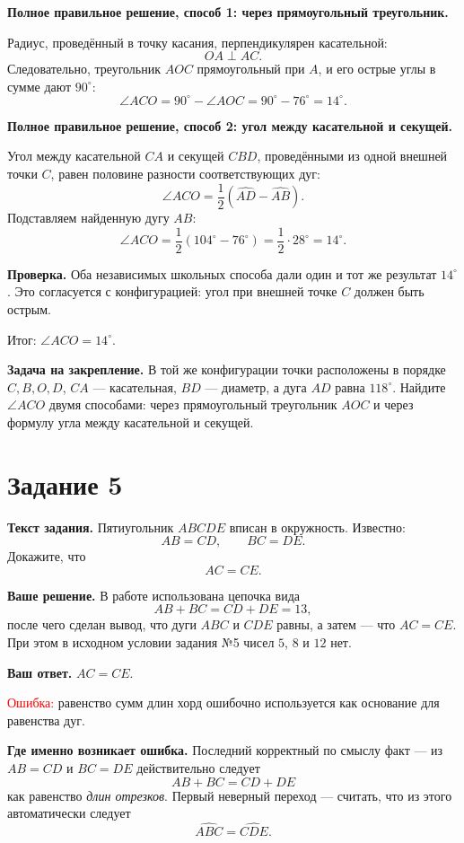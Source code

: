 \documentclass[12pt,a4paper]{article}
\newcommand{\errlabel}[1]{\textcolor{red}{Ошибка:} #1}
\newcommand{\resultlabel}[1]{\textcolor{teal!60!black}{Итог:} #1}
\begin{document}
\textbf{Полное правильное решение, способ 1: через прямоугольный треугольник.}

Радиус, проведённый в точку касания, перпендикулярен касательной:
\[
OA\perp AC.
\]
Следовательно, треугольник $AOC$ прямоугольный при $A$, и его острые углы в сумме дают $90^\circ$:
\[
\angle ACO=90^\circ-\angle AOC=90^\circ-76^\circ=14^\circ.
\]

\textbf{Полное правильное решение, способ 2: угол между касательной и секущей.}

Угол между касательной $CA$ и секущей $CBD$, проведёнными из одной внешней точки $C$, равен половине разности соответствующих дуг:
\[
\angle ACO=\frac12\left(\widehat{AD}-\widehat{AB}\right).
\]
Подставляем найденную дугу $AB$:
\[
\angle ACO=\frac12(104^\circ-76^\circ)=\frac12\cdot 28^\circ=14^\circ.
\]

\textbf{Проверка.} Оба независимых школьных способа дали один и тот же результат $14^\circ$. Это согласуется с конфигурацией: угол при внешней точке $C$ должен быть острым.

\resultlabel{$\angle ACO=14^\circ$.}

\textbf{Задача на закрепление.} В той же конфигурации точки расположены в порядке $C,B,O,D$, $CA$ --- касательная, $BD$ --- диаметр, а дуга $AD$ равна $118^\circ$. Найдите $\angle ACO$ двумя способами: через прямоугольный треугольник $AOC$ и через формулу угла между касательной и секущей.

\newpage
{}\label{task:5}
\section*{Задание 5}

\textbf{Текст задания.} Пятиугольник $ABCDE$ вписан в окружность. Известно:
\[
AB=CD,\qquad BC=DE.
\]
Докажите, что
\[
AC=CE.
\]

\textbf{Ваше решение.} В работе использована цепочка вида
\[
AB+BC=CD+DE=13,
\]
после чего сделан вывод, что дуги $ABC$ и $CDE$ равны, а затем --- что $AC=CE$. При этом в исходном условии задания №5 чисел $5$, $8$ и $12$ нет.

\textbf{Ваш ответ.} $AC=CE$.

\errlabel{равенство сумм длин хорд ошибочно используется как основание для равенства дуг.}

\textbf{Где именно возникает ошибка.} Последний корректный по смыслу факт --- из $AB=CD$ и $BC=DE$ действительно следует
\[
AB+BC=CD+DE
\]
как равенство \emph{длин отрезков}. Первый неверный переход --- считать, что из этого автоматически следует
\[
\widehat{ABC}=\widehat{CDE}.
\]
\end{document}
